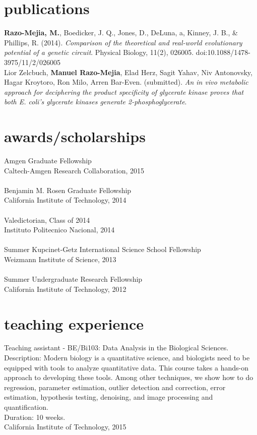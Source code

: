 \documentclass[]{friggeri-cv}
\begin{document}
\section{publications}
\textbf{Razo-Mejia, M.}, Boedicker, J. Q., Jones, D., DeLuna, a, Kinney, J. B., & Phillips, R. (2014). \textit{Comparison of the theoretical and real-world evolutionary potential of a genetic circuit}. Physical Biology, 11(2), 026005. doi:10.1088/1478-3975/11/2/026005\\

Lior Zelcbuch, \textbf{Manuel Razo-Mejia}, Elad Herz, Sagit Yahav, Niv Antonovsky, Hagar Kroytoro, Ron Milo, Arren Bar-Even. (submitted). \textit{An in vivo metabolic approach for deciphering the product specificity of glycerate kinase proves that both E. coli's glycerate kinases generate 2-phosphoglycerate}.

\newpage 
\section{awards/scholarships}
Amgen Graduate Fellowship\\
{Caltech-Amgen Research Collaboration, 2015}\\
\\
Benjamin M. Rosen Graduate Fellowship\\
{California Institute of Technology, 2014}\\
\\
Valedictorian, Class of 2014\\
{Instituto Politecnico Nacional, 2014}\\
\\
Summer Kupcinet-Getz International Science School Fellowship\\
{Weizmann Institute of Science, 2013}\\
\\
Summer Undergraduate Research Fellowship\\
{California Institute of Technology, 2012}\\

\section{teaching experience}
Teaching assistant - BE/Bi103: Data Analysis in the Biological Sciences.\\
Description: Modern biology is a quantitative science, and biologists need to be equipped with tools to analyze quantitative data. This course takes a hands-on approach to developing these tools. Among other techniques, we show how to do regression, parameter estimation, outlier detection and correction, error estimation, hypothesis testing, denoising, and image processing and quantification.\\
Duration: 10 weeks.\\
{California Institute of Technology, 2015}\\
\end{document}
